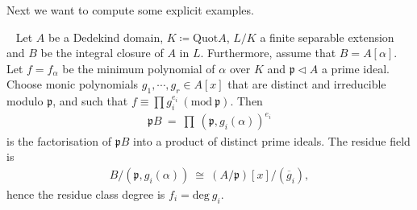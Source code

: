 \documentclass[12pt,a4paper,footinclude=true,headinclude=true]{scrbook} %
\newenvironment{proposition}[2][]
{\renewcommand\theinnercustomprop{#2}\innercustomprop[#1] 
\begin{mdframed}[backgroundcolor=gray!20]\ }
{\end{mdframed}\endinnercustomprop}
\begin{document}
Next we want to compute some explicit examples.
\begin{proposition}{164}
    Let $A$ be a Dedekind domain, $K\coloneqq\mathrm{Quot}A$, $L/K$ a finite separable extension and $B$ be the integral closure of $A$ in $L$. Furthermore, assume that $B=A[\alpha]$. Let $f=f_\alpha$ be the minimum polynomial of $\alpha$ over $K$ and $\mathfrak{p}\triangleleft A$ a prime ideal. Choose monic polynomials $g_1,\cdots,g_r\in A[x]$ that are distinct and irreducible modulo $\mathfrak{p}$, and such that $f\equiv \prod g_i^{e_i}\ (\mathrm{mod}\ \mathfrak{p})$. Then 
    \begin{align*}
        \mathfrak{p}B\ =\ \prod\ (\mathfrak{p},g_i(\alpha))^{e_i}
    \end{align*}
    is the factorisation of $\mathfrak{p}B$ into a product of distinct prime ideals. The residue field is 
    \begin{align*}
        B/(\mathfrak{p},g_i(\alpha))\ \cong\ (A/\mathfrak{p})[x]/(\overline{g}_i),
    \end{align*}
    hence the residue class degree is $f_i=\mathrm{deg}\ g_i$.
\end{proposition}
\end{document}
